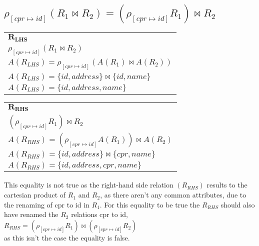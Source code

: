 \subsection{$\rho_{[cpr\mapsto id]}(R_1 \Join R_2) = (\rho_{[cpr\mapsto id]} R_1) \Join R_2$}

\begin{table}[ht]
	\begin{tabular}{l}
		$\bm{R_{LHS}}$  \\
		$\rho_{[cpr\mapsto id]}(R_1 \Join R_2)$  \\
		$A(R_{LHS}) = \rho_{[cpr\mapsto id]}(A(R_1) \Join A(R_2))$  \\
		$A(R_{LHS}) = \{id, address\} \Join \{id, name\}$  \\
		$A(R_{LHS}) = \{id, address, name\}$
	\end{tabular}
\end{table}

\begin{table}[ht]
	\begin{tabular}{l}
		$\bm{R_{RHS}}$ \\
	 	$(\rho_{[cpr\mapsto id]} R_1) \Join R_2$ \\
		$A(R_{RHS}) = (\rho_{[cpr\mapsto id]}A(R_1)) \Join A(R_2)$ \\
		$A(R_{RHS}) = \{id, address\} \Join \{cpr, name\}$ \\
		$A(R_{RHS}) = \{id, address, cpr, name\}$
	\end{tabular}
\end{table}
\FloatBarrier

This equality is not true as the right-hand side relation $(R_{RHS})$ results to the cartesian product of $R_1$ and $R_2$, as there aren't any common attributes, due to the renaming of cpr to id in $R_1$.
For this equality to be true the $R_{RHS}$ should also have renamed the $R_2$ relations cpr to id,\\
$R_{RHS} = (\rho_{[cpr\mapsto id]} R_1) \Join (\rho_{[cpr\mapsto id]} R_2)$\\
as this isn't the case the equality is false.\\\\
